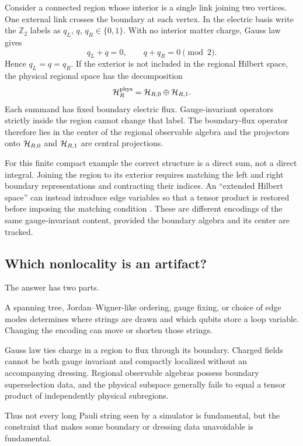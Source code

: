 Consider a connected region whose interior is a single link joining two
vertices.  One external link crosses the boundary at each vertex.  In the
electric basis write the $\mathbb Z_2$ labels as
$q_L$, $q$, $q_R\in\{0,1\}$.  With no interior matter charge, Gauss law gives
\begin{equation}
  q_L+q=0,
  \qquad
  q+q_R=0
  \pmod 2.
  \label{eq:z2-two-vertex-gauss}
\end{equation}
Hence $q_L=q=q_R$.  If the exterior is not included in the regional Hilbert
space, the physical regional space has the decomposition
\begin{equation}
  \mathcal{H}_R^{\mathrm{phys}}
  =\mathcal{H}_{R,0}\oplus\mathcal{H}_{R,1}.
  \label{eq:z2-boundary-direct-sum}
\end{equation}
Each summand has fixed boundary electric flux.  Gauge-invariant operators
strictly inside the region cannot change that label.  The boundary-flux
operator therefore lies in the center of the regional observable algebra and
the projectors onto $\mathcal{H}_{R,0}$ and $\mathcal{H}_{R,1}$ are central projections.

For this finite compact example the correct structure is a direct sum, not a
direct integral.  Joining the region to its exterior requires matching the
left and right boundary representations and contracting their indices.  An
``extended Hilbert space'' can instead introduce edge variables so that a
tensor product is restored before imposing the matching condition
\cite{CasiniHuertaRosabal:2014,DonnellyFreidel:2016}.  These are different
encodings of the same gauge-invariant content, provided the boundary algebra
and its center are tracked.

\subsection{Which nonlocality is an artifact?}

The answer has two parts.
\begin{description}[style=nextline]
  \item[Encoding-dependent nonlocality.]
  A spanning tree, Jordan--Wigner-like ordering, gauge fixing, or choice of
  edge modes determines where strings are drawn and which qubits store a loop
  variable.  Changing the encoding can move or shorten those strings.

  \item[Structural nonlocality or nonfactorization.]
  Gauss law ties charge in a region to flux through its boundary.  Charged
  fields cannot be both gauge invariant and compactly localized without an
  accompanying dressing.  Regional observable algebras possess boundary
  superselection data, and the physical subspace generally fails to equal a
  tensor product of independently physical subregions.
\end{description}
Thus not every long Pauli string seen by a simulator is fundamental, but the
constraint that makes some boundary or dressing data unavoidable is
fundamental.

